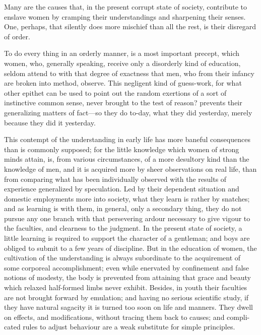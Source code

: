 Many are the causes that, in the present corrupt state of
society, contribute to enslave women by cramping their understandings
and sharpening their senses. One, perhaps, that silently does more
mischief than all the rest, is their disregard of order.

To do every thing in an orderly manner, is a most important precept,
which women, who, generally speaking, receive only a disorderly kind
of education, seldom attend to with that degree of exactness that men,
who from their infancy are broken into method, observe. This negligent
kind of guess-work, for what other epithet can be used to point out
the random exertions of a sort of instinctive common sense, never
brought to the test of reason? prevents their generalizing matters of
fact---so they do to-day, what they did yesterday, merely because they
did it yesterday.

This contempt of the understanding in early life has more baneful
consequences than is commonly supposed; for the little knowledge which
women of strong minds attain, is, from various circumstances, of a
more desultory kind than the knowledge of men, and it is acquired more
by sheer observations on real  life, than from comparing what
has been individually observed with the results of experience
generalized by speculation. Led by their dependent situation and
domestic employments more into society, what they learn is rather by
snatches; and as learning is with them, in general, only a secondary
thing, they do not pursue any one branch with that persevering ardour
necessary to give vigour to the faculties, and clearness to the
judgment. In the present state of society, a little learning is
required to support the character of a gentleman; and boys are obliged
to submit to a few years of discipline. But in the education of women,
the cultivation of the understanding is always subordinate to the
acquirement of some corporeal accomplishment; even while enervated by
confinement and false notions of modesty, the body is prevented from
attaining that grace and beauty which relaxed half-formed limbs never
exhibit. Besides, in youth their faculties are not brought forward by
emulation; and having no serious scientific study, if they have
natural sagacity it is turned too soon on life and manners. They dwell
on effects, and modifications, without tracing them back to causes;
and compli-cated rules to adjust behaviour are a weak
substitute for simple principles.

